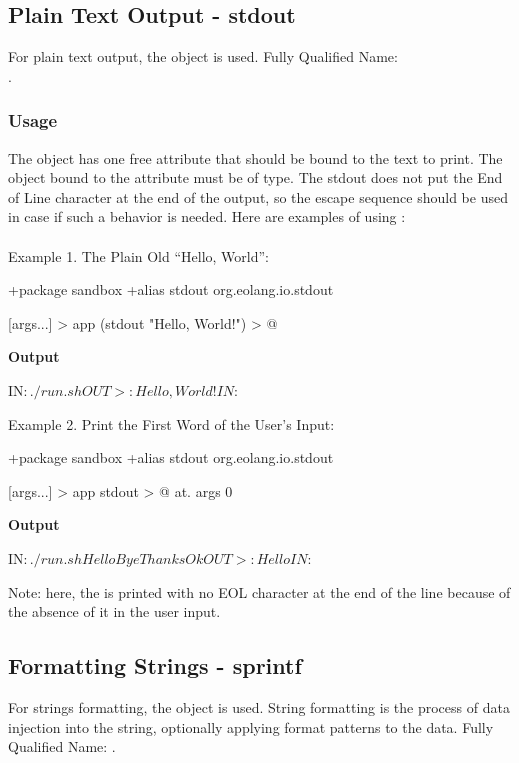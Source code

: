 \documentclass[12pt]{book}
\begin{document}
{{{\subsection{Plain Text Output - stdout} \label{subsec:stdout}
For plain text output, the  object is used.
Fully Qualified Name:
\\
.

\subsubsection{Usage}
The  object has one free attribute  that should be bound to the text to print.
The object bound to the  attribute must be of  type.
The stdout does not put the End of Line character at the end of the output, so the \ff{\n} escape sequence should be used in case if such a behavior is needed. Here are examples of using :
\\
\\
Example 1. The Plain Old “Hello, World”:
\begin{ffcode}
+package sandbox
+alias stdout org.eolang.io.stdout

[args...] > app
  (stdout "Hello, World!\n") > @
\end{ffcode}
\textbf{Output}
\begin{ffcode}
IN$: ./run.sh
OUT>: Hello, World!
IN$:
\end{ffcode}
Example 2. Print the First Word of the User's Input:
\begin{ffcode}
+package sandbox
+alias stdout org.eolang.io.stdout

[args...] > app
  stdout > @
    at.
      args
      0
\end{ffcode}
\textbf{Output}
\begin{ffcode}
IN$: ./run.sh Hello Bye Thanks Ok
OUT>: HelloIN$:
\end{ffcode}

Note: here, the  is printed with no EOL character at the end of the line because of the absence of it in the user input.

\subsection{Formatting Strings - sprintf} \label{subsec:sprintf}
For strings formatting, the  object is used.
String formatting is the process of data injection into the string, optionally applying format patterns to the data.
Fully Qualified Name: .

}}}
\end{document}
